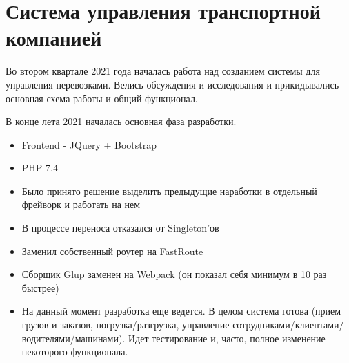 \documentclass[10pt]{tpl/developercv} %
\begin{document}
\section{Система управления транспортной компанией}
Во втором квартале 2021 года началась работа над созданием системы для управления перевозками. Велись обсуждения и исследования и прикидывались основная схема работы и общий функционал.

В конце лета 2021 началась основная фаза разработки.

\begin{itemize}
  \item Frontend - JQuery + Bootstrap
  \item PHP 7.4
  \item Было принято решение выделить предыдущие наработки в отдельный фрейворк и работать на нем
  \item В процессе переноса отказался от Singleton'ов
  \item Заменил собственный роутер на FastRoute
  \item Сборщик Glup заменен на Webpack (он показал себя минимум в 10 раз быстрее)
  \item На данный момент разработка еще ведется. В целом система готова (прием грузов и заказов, погрузка/разгрузка, управление сотрудниками/клиентами/водителями/машинами). Идет тестирование и, часто, полное изменение некоторого функционала.
\end{itemize}

\end{document}
